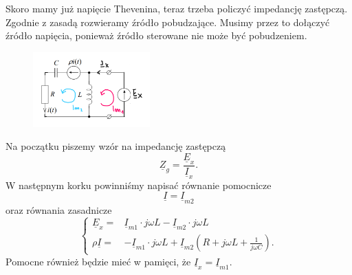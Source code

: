 \documentclass[12pt, a4paper]{article}
\begin{document}
Skoro mamy już napięcie Thevenina, teraz trzeba policzyć impedancję zastępczą.
Zgodnie z zasadą rozwieramy źródło pobudzające. Musimy przez to dołączyć
źródło napięcia, ponieważ źródło sterowane nie może być pobudzeniem.
\begin{figure}[H]
  \centering
  \includegraphics[width = 0.4\textwidth]{./images/Lista_3/3.3.2.png}
\end{figure}
Na początku piszemy wzór na impedancję zastępczą
\begin{equation*}
  \underline{Z}_g = \frac{\underline{E}_x}{\underline{I}_x}.
\end{equation*}
W następnym korku powinniśmy napisać równanie pomocnicze
\begin{equation}\label{3.3_2_pomocnicze}
  \underline{I} =   \underline{I}_{m2}
\end{equation}
oraz równania zasadnicze
\begin{equation}\label{3.3_2_zasadnicze}
  \left\{
  \begin{array}{rl}
    \underline{E}_x =    & \underline{I}_{m1}\cdot j\omega L -\underline{I}_{m2} \cdot j\omega L                                  \\
    \rho \underline{I} = & -\underline{I}_{m1}\cdot j\omega L + \underline{I}_{m2}\left(R+j\omega L + \frac{1}{j\omega C}\right).
  \end{array}
  \right.
\end{equation}
Pomocne również będzie mieć w pamięci, że $\underline{I}_x = \underline{I}_{m1}$.
\end{document}
